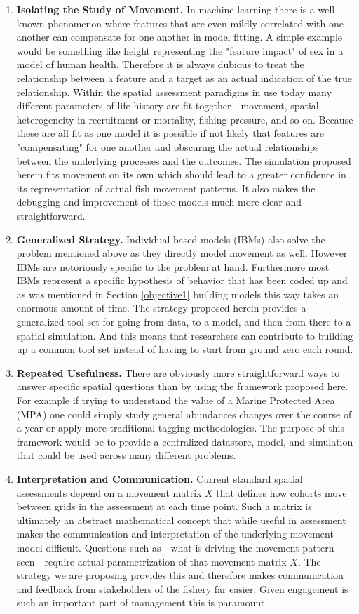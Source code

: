 \documentclass[11pt]{article}
\begin{document}
\begin{enumerate}
\item \textbf{Isolating the Study of Movement.} In machine learning there is a well known phenomenon where features that are even mildly correlated with one another can compensate for one another in model fitting. A simple example would be something like height representing the "feature impact" of sex in a model of human health. Therefore it is always dubious to treat the relationship between a feature and a target as an actual indication of the true relationship. Within the spatial assessment paradigms in use today many different parameters of life history are fit together - movement, spatial heterogeneity in recruitment or mortality, fishing pressure, and so on. Because these are all fit as one model it is possible if not likely that features are "compensating" for one another and obscuring the actual relationships between the underlying processes and the outcomes. The simulation proposed herein fits movement on its own which should lead to a greater confidence in its representation of actual fish movement patterns. It also makes the debugging and improvement of those models much more clear and straightforward. 
\item \textbf{Generalized Strategy.} Individual based models (IBMs) also solve the problem mentioned above as they directly model movement as well. However IBMs are notoriously specific to the problem at hand. Furthermore most IBMs represent a specific hypothesis of behavior that has been coded up and as was mentioned in Section \ref{objective1} building models this way takes an enormous amount of time. The strategy proposed herein provides a generalized tool set for going from data, to a model, and then from there to a spatial simulation. And this means that researchers can contribute to building up a common tool set instead of having to start from ground zero each round.
\item \textbf{Repeated Usefulness.} There are obviously more straightforward ways to answer specific spatial questions than by using the framework proposed here. For example if trying to understand the value of a Marine Protected Area (MPA) one could simply study general abundances changes over the course of a year or apply more traditional tagging methodologies. The purpose of this framework would be to provide a centralized datastore, model, and simulation that could be used across many different problems.
\item \textbf{Interpretation and Communication.} Current standard spatial assessments depend on a movement matrix $X$ that defines how cohorts move between grids in the assessment at each time point. Such a matrix is ultimately an abstract mathematical concept that while useful in assessment makes the communication and interpretation of the underlying movement model difficult. Questions such as - what is driving the movement pattern seen - require actual parametrization of that movement matrix $X$. The strategy we are proposing provides this and therefore makes communication and feedback from stakeholders of the fishery far easier. Given engagement is such an important part of management this is paramount.  
\end{enumerate}
\end{document}
